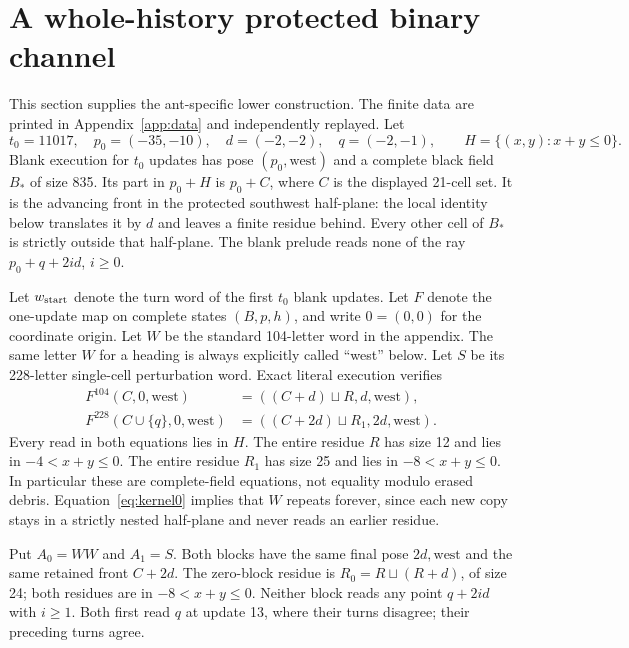 \documentclass[11pt]{article}
\theoremstyle{definition}\newtheorem{definition}[theorem]{Definition}
\theoremstyle{remark}\newtheorem{remark}[theorem]{Remark}
\begin{document}
\section{A whole-history protected binary channel}
This section supplies the ant-specific lower construction. The finite data
are printed in Appendix~\ref{app:data} and independently replayed. Let
\[
 t_0=11017,\quad p_0=(-35,-10),\quad d=(-2,-2),\quad q=(-2,-1),
 \qquad H=\{(x,y):x+y\le 0\}.
\]
Blank execution for $t_0$ updates has pose $(p_0,\text{west})$ and a complete black field
$B_*$ of size 835. Its part in $p_0+H$ is $p_0+C$, where $C$ is the displayed
21-cell set. It is the advancing front in the protected southwest half-plane:
the local identity below translates it by $d$ and leaves a finite residue
behind. Every other cell of $B_*$ is strictly outside that half-plane.
The blank prelude reads none of the ray $p_0+q+2 i d$, $i\ge 0$.

Let $w_{\rm start}$ denote the turn word of the first $t_0$ blank updates.
Let $F$ denote the one-update map on complete states $(B,p,h)$, and write
$0=(0,0)$ for the coordinate origin.
Let $W$ be the standard 104-letter word in the appendix. The same letter $W$
for a heading is always explicitly called ``west'' below. Let $S$ be its
228-letter single-cell perturbation word. Exact literal execution verifies
\begin{align}
 F^{104}(C,0,\text{west})
   &=((C+d)\sqcup R,d,\text{west}),\label{eq:kernel0}\\
 F^{228}(C\cup\{q\},0,\text{west})
   &=((C+2 d)\sqcup R_1,2 d,\text{west}).\label{eq:kernel1}
\end{align}
Every read in both equations lies in $H$. The entire residue $R$ has size 12
and lies in $-4<x+y\le 0$. The entire residue $R_1$ has size 25 and lies in
$-8<x+y\le 0$. In particular these are complete-field equations, not equality
modulo erased debris. Equation~\eqref{eq:kernel0} implies that $W$ repeats
forever, since each new copy stays in a strictly nested half-plane and never
reads an earlier residue.

Put $A_0=WW$ and $A_1=S$. Both blocks have the same final pose $2 d,\text{west}$
and the same retained front $C+2 d$. The zero-block residue is
$R_0=R\sqcup(R+d)$, of size 24; both residues are in $-8<x+y\le 0$.
Neither block reads any point $q+2 i d$ with $i\ge 1$. Both first read $q$ at
update 13, where their turns disagree; their preceding turns agree.
\end{document}
